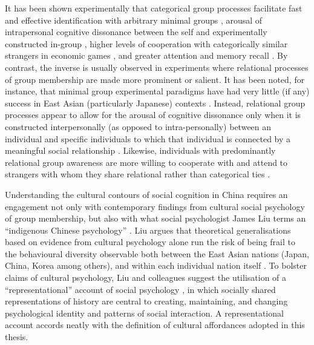 \begin{CJK}{UTF8}{gbsn}
It has been shown experimentally that categorical group processes facilitate fast and effective identification with arbitrary minimal groups \citep{Diehl1990,VanBavel2014}, arousal of intrapersonal cognitive dissonance between the self and experimentally constructed in-group \citep{Festinger1957,Stone2001}, higher levels of cooperation with categorically similar strangers in economic games \citep{Yuki2005,Yuki2003}, and greater attention and memory recall \citep{Buchan2006,Ng2016}.  By contrast, the inverse is usually observed in experiments where relational processes of group membership are made more prominent or salient.  It has been noted, for instance, that minimal group experimental paradigms have had very little (if any) success in East Asian (particularly Japanese) contexts \citep[586]{Liu2009}.  Instead, relational group processes appear to allow for the arousal of cognitive dissonance only when it is constructed interpersonally (as opposed to intra-personally) between an individual and specific individuals to which that individual is connected by a meaningful social relationship \citep{Hoshino-Browne2005}.  Likewise, individuals with predominantly relational group awareness are more willing to cooperate with and attend to strangers with whom they share relational rather than categorical ties \citep{Ng2016,Yuki2005}.


Understanding the cultural contours of social cognition in China requires an engagement not only with contemporary findings from cultural social psychology of group membership, but also with what social psychologist James Liu terms an ``indigenous Chinese psychology'' \citep{Triandis1996,Liu2009}.  Liu argues that theoretical generalisations based on evidence from cultural psychology alone run the risk of being frail to the behavioural diversity observable both between the East Asian nations (Japan, China, Korea among others), and within each individual nation itself \citep[for example, the vast internal cultural variation in China between North and South, East and West; see][]{Henrich2014}.  To bolster claims of cultural psychology, Liu and colleagues suggest the utilisation of a ``representational'' account of social psychology \citep{Liu2005}, in which socially shared representations of history are central to creating, maintaining, and changing psychological identity and patterns of social interaction.  A representational account accords neatly with the definition of cultural affordances adopted in this thesis.


\end{CJK}
